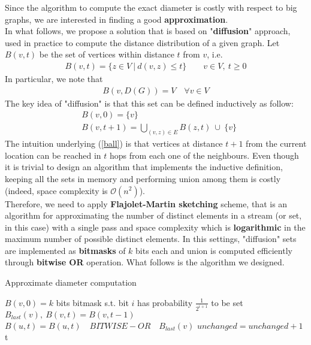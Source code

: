 Since the algorithm to compute the exact diameter is costly with respect to big graphs, we are interested in finding a good \textbf{approximation}.\\
In what follows, we propose a solution that is based on "\textbf{diffusion}" approach, used in practice to compute the distance distribution of a given graph. Let $B(v,t)$ be the set of vertices within distance $t$ from $v$, i.e.
\begin{align*}
B(v,t) = \{ z \in V \ | \ d(v,z) \le t \} \qquad v \in V, \ t \ge 0
\end{align*}
In particular, we note that
\begin{align}
B(v,D(G)) = V \quad \forall v \in V \label{ball_diameter}
\end{align}
The key idea of "diffusion" is that this set can be defined inductively as follow:
\begin{align}
&B(v,0) = \{ v \} \nonumber\\
&B(v,t+1) = \bigcup_{(v,z) \in E} B(z,t) \ \cup \ \{ v \} \label{ball}
\end{align}
The intuition underlying (\ref{ball}) is that vertices at distance $t+1$ from the current location can be reached in $t$ hops from each one of the neighbours. Even though it is trivial to design an algorithm that implements the inductive definition, keeping all the sets in memory and performing union among them is costly (indeed, space complexity is $\mathcal{O}(n^2)$).\\
Therefore, we need to apply \textbf{Flajolet-Martin sketching}\cite{fm} scheme, that is an algorithm for approximating the number of distinct elements in a stream (or set, in this case) with a single pass and space complexity which is \textbf{logarithmic} in the maximum number of possible distinct elements. In this settings, "diffusion" sets are implemented as \textbf{bitmasks} of $k$ bits each and union is computed efficiently through \textbf{bitwise OR} operation. What follows is the algorithm we designed.
\medskip
\begin{algorithm}
\caption{Approximate diameter computation}
\begin{algorithmic}[1]
		\State $B(v,0) = k$ bits bitmask s.t. bit $i$ has probability $\frac{1}{2^{i+1}}$ to be set
	\EndFor
			\State $B_{last}(v), \ B(v,t) = B(v,t-1)$
		\EndFor
			\State $B(u,t) = B(u,t) \quad BITWISE-OR \quad B_{last}(v)$
		\EndFor
				\State $unchanged = unchanged + 1$
			\EndIf
		\EndFor
			\State \Return t 
		\EndIf
	\EndFor
\end{algorithmic}
\end{algorithm}


